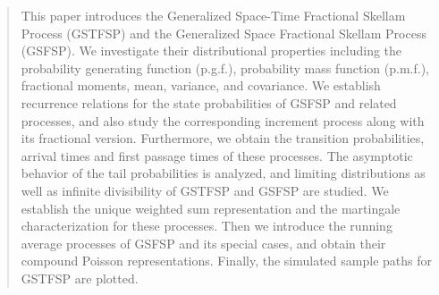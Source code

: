 \documentclass[11pt,oneside,reqno]{amsart}
\theoremstyle{definition}
\theoremstyle{remarkstyle}
\begin{document}
\begin{abstract}
This paper introduces the Generalized Space-Time Fractional Skellam Process (GSTFSP) and the Generalized Space Fractional Skellam Process (GSFSP). We investigate their distributional properties including the probability generating function (p.g.f.), probability mass function (p.m.f.), fractional moments, mean, variance, and covariance. We establish recurrence relations for the state probabilities of GSFSP and related processes, and also study the corresponding increment process along with its fractional version. Furthermore, we obtain the transition probabilities, arrival times and first passage times of these processes. The asymptotic behavior of the tail probabilities is analyzed, and limiting distributions as well as infinite divisibility of GSTFSP and GSFSP are studied. We establish the unique weighted sum representation and the martingale characterization for these processes. Then we introduce the running average processes of GSFSP and its special cases, and obtain their compound Poisson representations. Finally, the simulated sample paths for GSTFSP are plotted.
\end{abstract}

\maketitle


\end{document}
